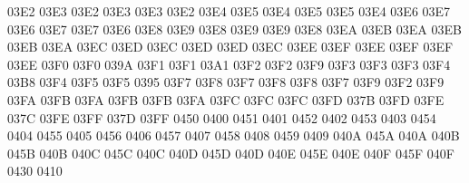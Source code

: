 \setcclcucx 03E2 03E3 03E2 %
\setcclcucx 03E3 03E3 03E2 %
\setcclcucx 03E4 03E5 03E4 %
\setcclcucx 03E5 03E5 03E4 %
\setcclcucx 03E6 03E7 03E6 %
\setcclcucx 03E7 03E7 03E6 %
\setcclcucx 03E8 03E9 03E8 %
\setcclcucx 03E9 03E9 03E8 %
\setcclcucx 03EA 03EB 03EA %
\setcclcucx 03EB 03EB 03EA %
\setcclcucx 03EC 03ED 03EC %
\setcclcucx 03ED 03ED 03EC %
\setcclcucx 03EE 03EF 03EE %
\setcclcucx 03EF 03EF 03EE %
\setcclcucx 03F0 03F0 039A %
\setcclcucx 03F1 03F1 03A1 %
\setcclcucx 03F2 03F2 03F9 %
\setcclcucx 03F3 03F3 03F3 %
\setcclcucx 03F4 03B8 03F4 %
\setcclcucx 03F5 03F5 0395 %
\setcclcucx 03F7 03F8 03F7 %
\setcclcucx 03F8 03F8 03F7 %
\setcclcucx 03F9 03F2 03F9 %
\setcclcucx 03FA 03FB 03FA %
\setcclcucx 03FB 03FB 03FA %
\setcclcucx 03FC 03FC 03FC %
\setcclcucx 03FD 037B 03FD %
\setcclcucx 03FE 037C 03FE %
\setcclcucx 03FF 037D 03FF %
 0450 0400 %
 0451 0401 %
 0452 0402 %
 0453 0403 %
 0454 0404 %
 0455 0405 %
 0456 0406 %
 0457 0407 %
 0458 0408 %
 0459 0409 %
\setcclcucx 040A 045A 040A %
\setcclcucx 040B 045B 040B %
\setcclcucx 040C 045C 040C %
\setcclcucx 040D 045D 040D %
\setcclcucx 040E 045E 040E %
\setcclcucx 040F 045F 040F %
 0430 0410 %
